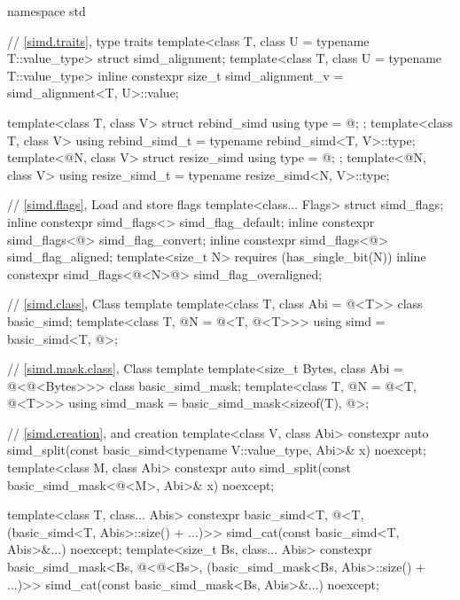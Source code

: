 \begin{codeblock}
namespace std {
  // \ref{simd.traits},  type traits
  template<class T, class U = typename T::value_type> struct simd_alignment;
  template<class T, class U = typename T::value_type>
    inline constexpr size_t simd_alignment_v = simd_alignment<T, U>::value;

  template<class T, class V> struct rebind_simd { using type = @\seebelow@; };
  template<class T, class V> using rebind_simd_t = typename rebind_simd<T, V>::type;
  template<@\simdsizetype@ N, class V> struct resize_simd { using type = @\seebelow@; };
  template<@\simdsizetype@ N, class V> using resize_simd_t = typename resize_simd<N, V>::type;

  // \ref{simd.flags}, Load and store flags
  template<class... Flags> struct simd_flags;
  inline constexpr simd_flags<> simd_flag_default{};
  inline constexpr simd_flags<@\convertflag@> simd_flag_convert{};
  inline constexpr simd_flags<@\alignedflag@> simd_flag_aligned{};
  template<size_t N> requires (has_single_bit(N))
    inline constexpr simd_flags<@\overalignedflag<N>@> simd_flag_overaligned{};

  // \ref{simd.class}, Class template 
  template<class T, class Abi = @\nativeabi@<T>> class basic_simd;
  template<class T, @\simdsizetype@ N = @\simdsizev@<T, @\nativeabi@<T>>>
    using simd = basic_simd<T, @>;

  // \ref{simd.mask.class}, Class template 
  template<size_t Bytes, class Abi = @\nativeabi@<@\integerfrom@<Bytes>>> class basic_simd_mask;
  template<class T, @\simdsizetype@ N = @\simdsizev@<T, @\nativeabi@<T>>>
    using simd_mask = basic_simd_mask<sizeof(T), @>;

  // \ref{simd.creation},  and  creation
  template<class V, class Abi>
    constexpr auto
      simd_split(const basic_simd<typename V::value_type, Abi>& x) noexcept;
  template<class M, class Abi>
    constexpr auto
      simd_split(const basic_simd_mask<@\maskelementsize@<M>, Abi>& x) noexcept;

  template<class T, class... Abis>
    constexpr basic_simd<T, @\deducet@<T, (basic_simd<T, Abis>::size() + ...)>>
      simd_cat(const basic_simd<T, Abis>&...) noexcept;
  template<size_t Bs, class... Abis>
    constexpr basic_simd_mask<Bs, @\deducet@<@\integerfrom@<Bs>,
                              (basic_simd_mask<Bs, Abis>::size() + ...)>>
      simd_cat(const basic_simd_mask<Bs, Abis>&...) noexcept;

}
\end{codeblock}
